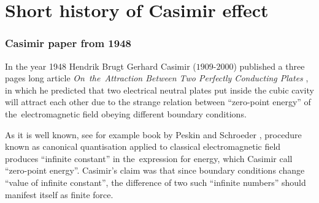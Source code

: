 \documentclass[10pt,t]{beamer}
\begin{document}
\section{Short history of Casimir effect}



\begin{frame}
  \frametitle{Casimir paper from 1948}


  In the year 1948 Hendrik Brugt Gerhard Casimir ($1909\text{-}2000$)
  published a three pages long article \textit{On~the~Attraction
    Between Two Perfectly Conducting Plates}
  \parencite{Casimir-On-the-Attraction-Between-ETC-Pub-1948}, in
  which he predicted that two electrical neutral plates put inside the
  cubic cavity will attract each other due to the strange relation between
  ``zero-point energy'' of the~electromagnetic field obeying different
  boundary conditions.

  As it is well known, see for example book by Peskin and Schroeder
  \parencite{Peskin-Schroeder-An-Introduction-to-Quantum-Field-Theory-Pub-1995},
  procedure known as canonical quantisation applied to classical
  electromagnetic field produces ``infinite constant'' in the~expression
  for energy, which Casimir call ``zero-point energy''. Casimir's claim
  was that since boundary conditions change ``value of infinite constant'',
  the difference of two such ``infinite numbers'' should manifest itself
  as finite force.

\end{frame}
\end{document}
